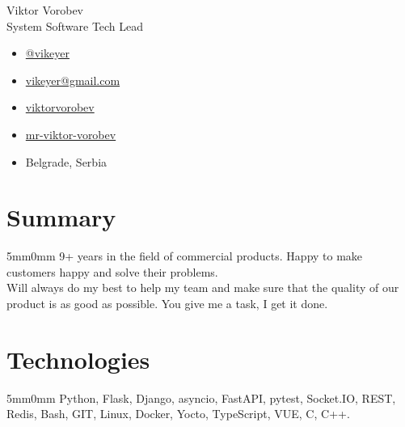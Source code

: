 \documentclass[10pt]{article}
\newcommand{\lmvalue}{5mm}
\newcommand{\rmvalue}{0mm}
\begin{document}
\begin{minipage}[b]{0.78\linewidth}
	{\fontsize{28pt}{28pt}\selectfont Viktor Vorobev}
	\\[1em]
	{\color{gray}\fontsize{16pt}{16pt}\selectfont System Software Tech Lead}
\end{minipage}
\hfill%
\begin{minipage}[b]{0.24\linewidth}
	\begin{flushleft}
		\begin{itemize}
			\item[\color{cyan}\faPaperPlane] \href{https://t.me/vikeyer}{@vikeyer}
			\item[\color{cyan}\faEnvelope] \href{mailto:vikeyer@gmail.com}{vikeyer@gmail.com}
			\item[\color{cyan}\faGithub] \href{https://github.com/viktorvorobev}{viktorvorobev}
			\item[\color{cyan}\faLinkedin] \href{https://www.linkedin.com/in/mr-viktor-vorobev/}{mr-viktor-vorobev}
			\item[\faBuildingO] Belgrade, Serbia
		\end{itemize}
	\end{flushleft}
\end{minipage}
\vspace{3mm}
\section*{Summary}
\begin{changemargin}{\lmvalue}{\rmvalue}
	9+ years in the field of commercial products.
	Happy to make customers happy and solve their problems.\\
	Will always do my best to help my team and make sure that the quality of our product is as good as possible.
	You give me a task, I get it done.
\end{changemargin}
\section*{Technologies}
\begin{changemargin}{\lmvalue}{\rmvalue}
	Python, Flask, Django, asyncio, FastAPI, pytest, Socket.IO, REST, Redis, Bash, GIT, Linux,
	Docker, Yocto, TypeScript, VUE, C, C++.
\end{changemargin}
\end{document}
